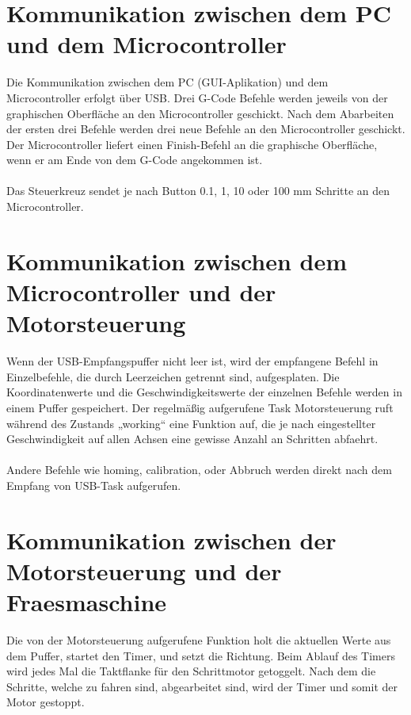 \documentclass[11pt,a4paper,bibtotoc,oneside]{scrbook}
\begin{document}
\section{Kommunikation zwischen dem PC und dem Microcontroller}
Die Kommunikation zwischen dem PC (GUI-Aplikation) und dem Microcontroller erfolgt über USB. Drei G-Code Befehle werden jeweils von der graphischen Oberfläche an den Microcontroller geschickt. Nach dem Abarbeiten der ersten drei Befehle werden drei neue Befehle an den Microcontroller geschickt. Der Microcontroller liefert einen Finish-Befehl an die graphische Oberfläche, wenn er am Ende von dem G-Code angekommen ist.\\\\
Das Steuerkreuz sendet je nach Button 0.1, 1, 10 oder 100 mm Schritte an den Microcontroller.
\section{Kommunikation zwischen dem Microcontroller und der Motorsteuerung}
Wenn der USB-Empfangspuffer nicht leer ist, wird der empfangene Befehl in Einzelbefehle, die durch Leerzeichen getrennt sind, aufgesplaten. Die Koordinatenwerte und die Geschwindigkeitswerte der einzelnen Befehle werden in einem Puffer gespeichert. Der regelmäßig aufgerufene Task Motorsteuerung ruft während des Zustands „working“ eine Funktion auf, die je nach eingestellter Geschwindigkeit auf allen Achsen eine gewisse Anzahl an Schritten abfaehrt. \\
\\Andere Befehle wie homing, calibration, oder Abbruch werden direkt nach dem Empfang von USB-Task aufgerufen.

\section{Kommunikation zwischen der Motorsteuerung und der Fraesmaschine}
Die von der Motorsteuerung aufgerufene Funktion holt die aktuellen Werte aus dem Puffer, startet den Timer, und setzt die Richtung. Beim Ablauf des Timers wird jedes Mal die Taktflanke für den Schrittmotor getoggelt. Nach dem die Schritte, welche zu fahren sind, abgearbeitet sind, wird der Timer und somit der Motor gestoppt.

\end{document}

